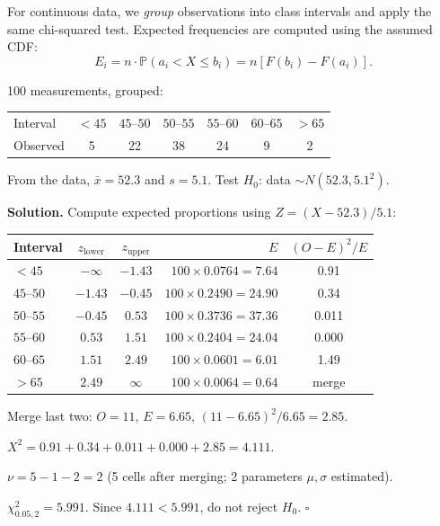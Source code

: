 \documentclass[12pt, a4paper, oneside]{book}
\theoremstyle{definition}
\theoremstyle{plain}
\theoremstyle{remark}
\newcommand{\Prob}{\mathbb{P}}
\newenvironment{solution}
  {\par\medskip\noindent\textbf{Solution.}\quad}
  {\hfill$\square$\par\medskip}
\begin{document}
For continuous data, we \emph{group} observations into class intervals and
apply the same chi-squared test.  Expected frequencies are computed using
the assumed CDF:
\[
  E_i = n \cdot \Prob(a_i < X \le b_i) = n[F(b_i) - F(a_i)].
\]

\begin{workedexample}
100 measurements, grouped:
\begin{center}
\begin{tabular}{lcccccc}
\toprule
Interval  & $<45$ & $45$--$50$ & $50$--$55$ & $55$--$60$ & $60$--$65$ & $>65$ \\
Observed  & 5     & 22          & 38          & 24          & 9           & 2     \\
\bottomrule
\end{tabular}
\end{center}
From the data, $\bar{x}=52.3$ and $s=5.1$.  Test $H_0$: data $\sim N(52.3,5.1^2)$.

\begin{solution}
Compute expected proportions using $Z=(X-52.3)/5.1$:
\begin{center}
\begin{tabular}{lccrc}
\toprule
Interval & $z_{\text{lower}}$ & $z_{\text{upper}}$ & $E$ & $(O-E)^2/E$ \\
\midrule
$<45$         & $-\infty$ & $-1.43$ & $100\times0.0764=7.64$ & 0.91 \\
$45$--$50$    & $-1.43$ & $-0.45$ & $100\times0.2490=24.90$ & 0.34 \\
$50$--$55$    & $-0.45$ & $0.53$ & $100\times0.3736=37.36$ & 0.011 \\
$55$--$60$    & $0.53$ & $1.51$ & $100\times0.2404=24.04$ & 0.000 \\
$60$--$65$    & $1.51$ & $2.49$ & $100\times0.0601=6.01$ & 1.49 \\
$>65$         & $2.49$ & $\infty$ & $100\times0.0064=0.64$ & merge \\
\bottomrule
\end{tabular}
\end{center}
Merge last two: $O=11$, $E=6.65$, $(11-6.65)^2/6.65=2.85$.

$X^2=0.91+0.34+0.011+0.000+2.85=4.111$.

$\nu = 5 - 1 - 2 = 2$ (5 cells after merging; 2 parameters $\mu,\sigma$ estimated).

$\chi^2_{0.05,2}=5.991$.  Since $4.111<5.991$, do not reject $H_0$.
\end{solution}
\end{workedexample}
\end{document}
